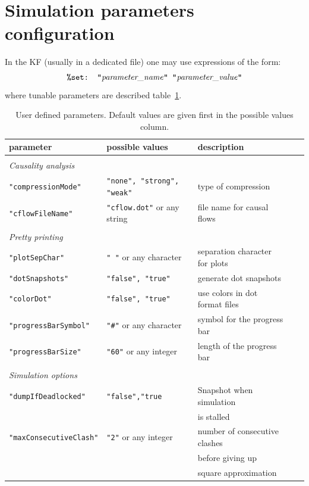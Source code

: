\documentclass[11pt]{book}
\def\ttt#1{\texttt{#1}}
\begin{document}
\section{Simulation parameters configuration}\label{sec:param}
In the KF (usually in a dedicated file) one may use expressions of the form:
\[
\hbox{\ttt{\%set: "}\textit{parameter\_name}\ttt{" "}\textit{parameter\_value}\ttt{"}}
\]
where tunable parameters are described table~\ref{tab:parameters}.
\begin{table}[ht]
\begin{tabular}{l|l|lll}
parameter & possible values & description \\
\hline &\\
\textit{Causality analysis}&\\
\ttt{"compressionMode"} & \ttt{"none", "strong", "weak"} & \small type of compression \\
\ttt{"cflowFileName"} & \ttt{"cflow.dot"} or any string & \small file name for causal flows\\ & \\
\textit{Pretty printing}&\\
\ttt{"plotSepChar"} & \ttt{" "} or any character & \small separation character for plots\\
\ttt{"dotSnapshots"} & \ttt{"false", "true"} & \small generate dot snapshots\\
\ttt{"colorDot"} &  \ttt{"false", "true"} & \small use colors in dot format files\\
\ttt{"progressBarSymbol"} & \ttt{"\#"} or any character & \small symbol for the progress bar\\
\ttt{"progressBarSize"} & \ttt{"60"} or any integer & \small length of the progress bar\\ &&\\
\textit{Simulation options} &\\
\ttt{"dumpIfDeadlocked"} & \ttt{"false","true} & \small Snapshot when simulation \\&&\small is stalled\\
\ttt{"maxConsecutiveClash"} & \ttt{"2"} or any integer & \small number of consecutive clashes \\ && \small before giving up \\ && \small square approximation\\

\end{tabular}\caption{User defined parameters. Default values are given first in the possible values column.}\label{tab:parameters}
\end{table}


 

\printindex
\end{document}
